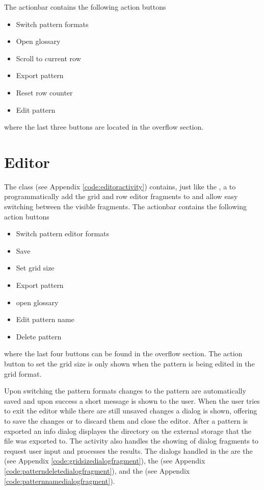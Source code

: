 The actionbar contains the following action buttons

\begin{itemize}
\item Switch pattern formats
\item Open glossary
\item Scroll to current row
\item Export pattern
\item Reset row counter
\item Edit pattern
\end{itemize}

where the last three buttons are located in the overflow section.

\section{Editor}
The class  (see Appendix \ref{code:editoractivity}) contains, just like the , a  to programmatically add the grid and row editor fragments to and allow easy switching between the visible fragments. The actionbar contains the following action buttons 

\begin{itemize}
\item Switch pattern editor formats
\item Save
\item Set grid size
\item Export pattern
\item open glossary
\item Edit pattern name
\item Delete pattern
\end{itemize}

where the last four buttons can be found in the overflow section. The action button to set the grid size is only shown when the pattern is being edited in the grid format.

Upon switching the pattern formats changes to the pattern are automatically saved and upon success a short message is shown to the user. When the user tries to exit the editor while there are still unsaved changes a dialog is shown, offering to save the changes or to discard them and close the editor. After a pattern is exported an info dialog displayes the directory on the external storage that the file was exported to.
The activity also handles the showing of dialog fragments to request user input and processes the results. The dialogs handled in the  are the  (see Appendix \ref{code:gridsizedialogfragment}), the  (see Appendix \ref{code:patterndeletedialogfragment}), and the  (see Appendix \ref{code:patternnamedialogfragment}).

